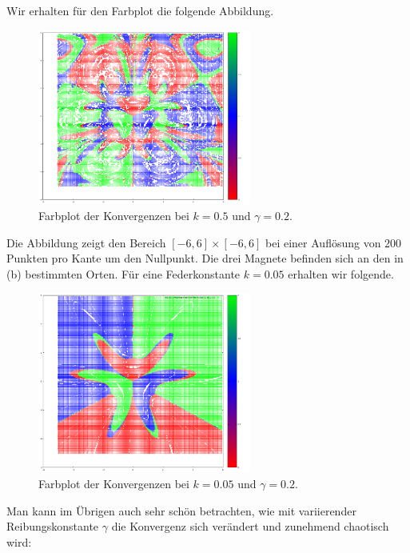 \documentclass[
    oneside,
    ngerman,
    footinclude=false,
    captions=tableheading,
    DIV=12
]{scrartcl}
\begin{document}
\subaufgabe{}
    Wir erhalten für den Farbplot die folgende Abbildung. 
    \begin{figure}[H]
        \centering
        \includegraphics[width=7cm]{../Simulation/img/Farbbild-k=05.png}
        \caption{Farbplot der Konvergenzen bei $k = 0.5$ und $\gamma = 0.2$.}
    \end{figure}
    Die Abbildung zeigt den Bereich $[-6,6]\times[-6,6]$ bei einer Auflösung von $200$ Punkten pro Kante um den Nullpunkt. Die drei Magnete befinden sich an den in (b) bestimmten Orten. Für eine Federkonstante $k = 0.05$ erhalten wir folgende. 
    \begin{figure}[H]
        \centering
        \includegraphics[width=7cm]{../Simulation/img/Farbbild-k=005.png}
        \caption{Farbplot der Konvergenzen bei $k = 0.05$ und $\gamma = 0.2$.}
    \end{figure}
    Man kann im Übrigen auch sehr schön betrachten, wie mit variierender Reibungskonstante $\gamma$ die Konvergenz sich verändert und zunehmend chaotisch wird:
\end{document}
